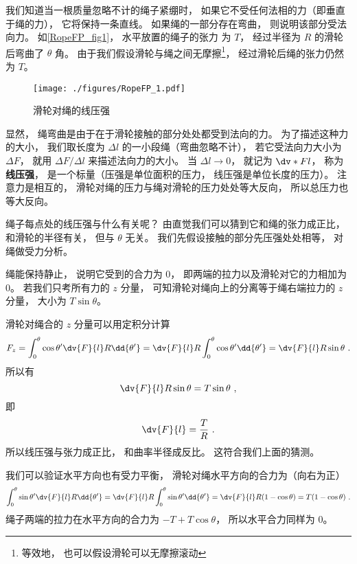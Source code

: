 

我们知道当一根质量忽略不计的绳子紧绷时， 如果它不受任何法相的力（即垂直于绳的力）， 它将保持一条直线。 如果绳的一部分存在弯曲， 则说明该部分受法向力。 如\autoref{RopeFP_fig1}， 水平放置的绳子的张力%
为 $T$， 经过半径为 $R$ 的滑轮后弯曲了 $\theta$ 角。 由于我们假设滑轮与绳之间无摩擦\footnote{等效地， 也可以假设滑轮可以无摩擦滚动}， 经过滑轮后绳的张力仍然为 $T$。
\begin{figure}[ht]
\centering
\texttt{[image: ./figures/RopeFP\_1.pdf]}
\caption{滑轮对绳的线压强} \label{RopeFP_fig1}
\end{figure}

显然， 绳弯曲是由于在于滑轮接触的部分处处都受到法向的力。 为了描述这种力的大小， 我们取长度为 $\Delta l$ 的一小段绳（弯曲忽略不计）， 若它受法向力大小为 $\Delta F$， 就用 $\Delta F/\Delta l$ 来描述法向力的大小。 当 $\Delta l \to 0$， 就记为 $\dv*{F}{l}$， 称为\textbf{线压强}， 是一个标量（压强是单位面积的压力， 线压强是单位长度的压力）。 注意力是相互的， 滑轮对绳的压力与绳对滑轮的压力处处等大反向， 所以总压力也等大反向。

绳子每点处的线压强与什么有关呢？ 由直觉我们可以猜到它和绳的张力成正比， 和滑轮的半径有关， 但与 $\theta$ 无关。 我们先假设接触的部分先压强处处相等， 对绳做受力分析。

绳能保持静止， 说明它受到的合力为 0， 即两端的拉力以及滑轮对它的力相加为 0。 若我们只考所有力的 $z$ 分量， 可知滑轮对绳向上的分离等于绳右端拉力的 $z$ 分量， 大小为 $T \sin\theta$。

滑轮对绳合的 $z$ 分量可以用定积分计算
\begin{equation}
F_z = \int_0^\theta \cos\theta' \dv{F}{l} R\dd{\theta'}
= \dv{F}{l} R \int_0^\theta \cos\theta' \dd{\theta'}
= \dv{F}{l} R \sin\theta~.
\end{equation}
所以有
\begin{equation}
\dv{F}{l} R \sin\theta = T \sin\theta~,
\end{equation}
即
\begin{equation}\label{RopeFP_eq1}
\dv{F}{l} = \frac{T}{R}~.
\end{equation}
所以线压强与张力成正比， 和曲率半径成反比。 这符合我们上面的猜测。

我们可以验证水平方向也有受力平衡， 滑轮对绳水平方向的合力为（向右为正）
\begin{equation}
\int_0^\theta \sin\theta' \dv{F}{l} R\dd{\theta'}
= \dv{F}{l} R \int_0^\theta \sin\theta' \dd{\theta'}
= \dv{F}{l} R (1 - \cos\theta)
= T(1 - \cos\theta)~.
\end{equation}
绳子两端的拉力在水平方向的合力为 $-T + T\cos\theta$， 所以水平合力同样为 0。

